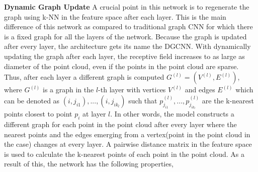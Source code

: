 \textbf{Dynamic Graph Update} A crucial point in this network is to regenerate the graph using \ac{k-NN} in the feature space after each layer. This is the main difference of this network as compared to traditional graph \ac{CNN} for which there is a fixed graph for all the layers of the network. Because the graph is updated after every layer, the architecture gets its name the \ac{DGCNN}. With dynamically updating the graph after each layer, the receptive field increases to as large as diameter of the point cloud, even if the points in the point cloud are sparse. Thus, after each layer a different graph is computed $G^{(l)} = (V^{(l)}, E^{(l)})$, where $G^{(l)}$ is a graph in the $l$-th layer with vertices $V^{(l)}$ and edges $E^{(l)}$ which can be denoted as $(i,j_{i1}), ... , (i,j_{ik_{l}})$ such that $p_{j_{i1}}^{(l)}, ... , p_{j_{ik_{l}}}^{(l)}$ are the k-nearest points closest to point $p_i$ at layer $l$. In other words, the model constructs a different graph for each point in the point cloud after every layer where the nearest points and the edges emerging from a vertex(point in the point cloud in the case) changes at every layer. A pairwise distance matrix in the feature space is used to calculate the k-nearest points of each point in the point cloud. As a result of this, the network has the following properties,
